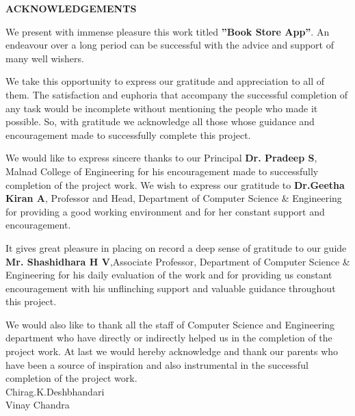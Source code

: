 \newpage
\begin{center}
\thispagestyle{empty}
\LARGE{\textbf{ACKNOWLEDGEMENTS}}\\[1cm]
\end{center}
\vspace{0.05cm}
\doublespacing


We present with immense pleasure this work titled \textbf{”Book Store App”}. An endeavour over a long period can be successful with the advice and support of
many well wishers.


We take this opportunity to express our gratitude and appreciation
to all of them.
The satisfaction and euphoria that accompany the successful completion of any
task would be incomplete without mentioning the people who made it possible. So,
with gratitude we acknowledge all those whose guidance and encouragement made to
successfully complete this project.


We would like to express sincere thanks to our Principal \textbf{Dr. Pradeep S}, Malnad
College of Engineering for his encouragement made to successfully completion of the
project work.
We wish to express our gratitude to \textbf{Dr.Geetha Kiran A}, Professor and Head,
Department of Computer Science \& Engineering for providing a good working environment and for her constant
support and encouragement.


It gives great pleasure in placing on record a deep sense of gratitude to our guide
\textbf{Mr. Shashidhara H V},Associate Professor, Department of Computer Science \& Engineering for his daily evaluation of the work and for providing us constant encouragement with his unflinching support and valuable guidance throughout this project.

We would also like to thank all the staff of Computer Science and Engineering
department who have directly or indirectly helped us in the completion of the project
work.
At last we would hereby acknowledge and thank our parents who have been a
source of inspiration and also instrumental in the successful completion of the project
work. \\
\large{\hspace*{4.5in} Chirag.K.Deshbhandari}\\
\large{\hspace*{4.5in} Vinay Chandra}


